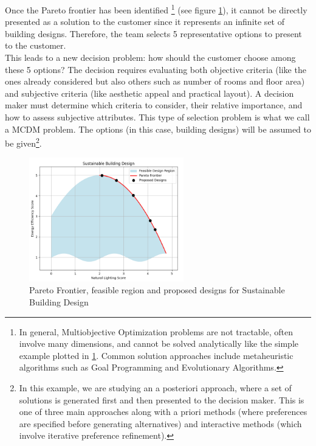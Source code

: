 Once the Pareto frontier has been identified
\footnote{In general, Multiobjective Optimization problems are not tractable, often involve many dimensions, and cannot be solved analytically like the simple example plotted in \ref{fig:pareto_frontier}. Common solution approaches include metaheuristic algorithms such as Goal Programming and Evolutionary Algorithms.}
(see figure \ref{fig:pareto_frontier}), it cannot be directly presented as a solution to the customer since it represents an infinite set of building designs. Therefore, the team selects 5 representative options to present to the customer. \\

This leads to a new decision problem: how should the customer choose among these 5 options? The decision requires evaluating both objective criteria (like the ones already considered but also others such as number of rooms and floor area) and subjective criteria (like aesthetic appeal and practical layout). A decision maker must determine which criteria to consider, their relative importance, and how to assess subjective attributes. This type of selection problem is what we call a MCDM problem. The options (in this case, building designs) will be assumed to be given\footnote{
In this example, we are studying an a posteriori approach, where a set of solutions is generated first and then presented to the decision maker. This is one of three main approaches along with a priori methods (where preferences are specified before generating alternatives) and interactive methods (which involve iterative preference refinement).}.

\begin{figure}[ht]
    \centering
    \includegraphics[width=0.6\textwidth]{ch2/figures/pareto.png}
    \caption{Pareto Frontier, feasible region and proposed designs for Sustainable Building Design}
    \label{fig:pareto_frontier}
\end{figure}


